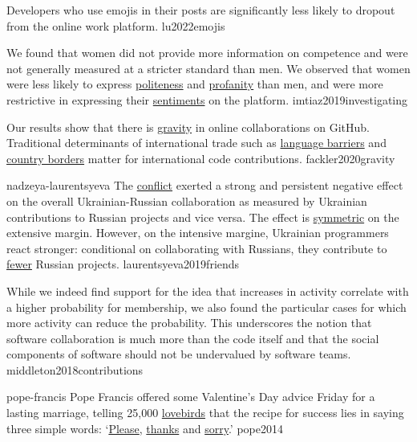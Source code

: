 \documentclass{article}
\begin{document}

  {Developers who use emojis in their posts are significantly less likely to dropout from the online work platform.}
  {lu2022emojis}

  {We found that women did not provide more information on competence and were not generally measured at a stricter standard than men. We observed that women were less likely to express \ul{politeness} and \ul{profanity} than men, and were more restrictive in expressing their \ul{sentiments} on the platform.}
  {imtiaz2019investigating}

  {Our results show that there is \ul{gravity} in online collaborations on GitHub. Traditional determinants of international trade such as \ul{language barriers} and \ul{country borders} matter for international code contributions.}
  {fackler2020gravity}

\qte
  {nadzeya-laurentsyeva}
  {The \ul{conflict} exerted a strong and persistent negative effect on the overall
  Ukrainian-Russian collaboration as measured by Ukrainian contributions
  to Russian projects and vice versa. The effect is \ul{symmetric} on the extensive margin.
  However, on the intensive margine, Ukrainian programmers react stronger: conditional
  on collaborating with Russians, they contribute to \ul{fewer} Russian projects.}
  {laurentsyeva2019friends}

  {While we indeed find support for the idea that increases in activity correlate with a higher probability for membership, we also found the particular cases for which more activity can reduce the probability. This underscores the notion that software collaboration is much more than the code itself and that the social components of software should not be undervalued by software teams.}
  {middleton2018contributions}

\qte
  {pope-francis}
  {Pope Francis offered some Valentine’s Day advice Friday for a lasting marriage, telling 25,000 \ul{lovebirds} that the recipe for success lies in saying three simple words: `\ul{Please}, \ul{thanks} and \ul{sorry}.'{}}
  {pope2014}
\end{document}
